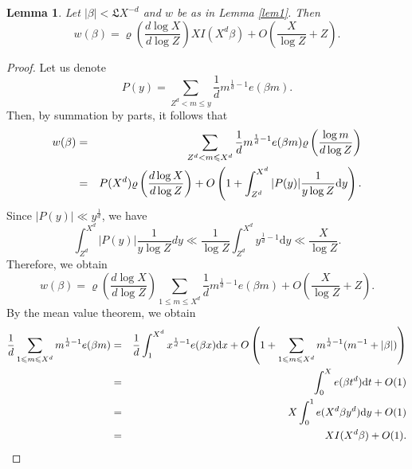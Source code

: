 \documentclass[reqno, 12pt, reqno]{amsart}
\numberwithin{equation}{section}
\newtheorem{lemma}[theorem]{Lemma}
\renewcommand{\leq}{\leqslant}
\renewcommand{\=}{\equiv}
\begin{document}
\begin{lemma}
Let $|\beta| < \mathfrak{L} X^{-d}$ and $w$ be as in Lemma \ref{lem1}.
Then
$$
w(\beta) = \varrho \left(  \frac{d \log X}{d \log Z}  \right) X  I( X^d  \beta )  + O  \left( \frac{X}{\log Z}  +  Z \right).
$$
\end{lemma}
\begin{proof}
Let us denote
$$
P(y) = \sum_{Z^d < m \leq y} \frac{1}{d} m^{\frac{1}{d} - 1} e(\beta m).
$$
Then, by summation by parts, it follows that
\begin{eqnarray}
\notag
w(\beta) &=& \sum_{Z^d < m \leq X^d} \frac{1}{d} m^{\frac{1}{d} - 1} e(\beta m) \varrho \left(  \frac{\log m}{d \log Z}  \right)
\\
\notag
&=&
P(X^d) \varrho \left(  \frac{d \log X}{d \log Z}  \right) + O \left(1 +  \int_{Z^d}^{X^d} |P(y)| \frac{ 1 }{y \log Z} \mathrm{d} y \right).
\end{eqnarray}
Since $|P(y)| \ll y^{\frac{1}{d}}$, we have
$$
\int_{Z^d}^{X^d} |P(y)| \frac{ 1 }{y \log Z} dy  \ll \frac{1}{\log Z} \int_{Z^d}^{X^d} y^{\frac{1}{d} - 1} \mathrm{d} y \ll \frac{X}{\log Z}.
$$
Therefore, we obtain
$$
w(\beta) = \varrho \left(  \frac{d \log X}{d \log Z}  \right) \sum_{1 \leq  m \leq X^d} \frac{1}{d} m^{\frac{1}{d} - 1} e(\beta m) + O  \left( \frac{X}{\log Z} + Z \right).
$$
By the mean value theorem, we obtain
\begin{eqnarray}
\frac{1}{d}
\sum_{1 \leq  m \leq X^d} m^{\frac{1}{d}-1 }  e ( \beta m  )
\notag
&=&
\frac{1}{d}
\int_{1}^{X^d} x^{\frac{1}{d}-1 }  e ( \beta  x ) \mathrm{d} x
+ O\left( 1 + \sum_{1 \leq  m \leq X^d} m^{\frac{1}{d}-1}(m^{-1} + |\beta|)   \right)
\\
\notag
&=&
\int_{0}^{X}   e ( \beta  t^d ) \mathrm{d} t
+ O( 1 )
\\
\notag
&=&
X \int_{0}^{1}  e ( X^d \beta  y^d ) \mathrm{d} y
+ O( 1 )
\\
\notag
&=&
X  I( X^d  \beta ) + O( 1 ).
\end{eqnarray}
\end{proof}
\end{document}
